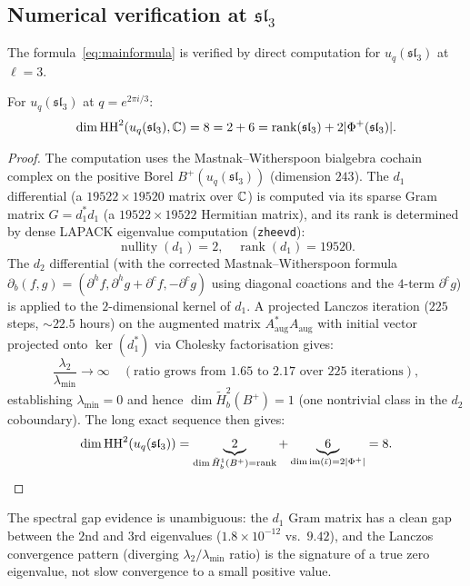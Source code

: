 \subsection{Numerical verification at \texorpdfstring{$\mathfrak{sl}_3$}{sl3}}
\label{sec:sl3verification}

The formula~\eqref{eq:mainformula} is verified by direct computation for $u_q(\mathfrak{sl}_3)$ at $\ell = 3$.

\begin{theorem}[$A_2$ verification]
\label{thm:sl3final}
For $u_q(\mathfrak{sl}_3)$ at $q = e^{2\pi i/3}$:
\[
\dim \operatorname{HH}^2(u_q(\mathfrak{sl}_3), \mathbb{C}) = 8 = 2 + 6 = \operatorname{rank}(\mathfrak{sl}_3) + 2|\Phi^+(\mathfrak{sl}_3)|.
\]
\end{theorem}

\begin{proof}
The computation uses the Mastnak--Witherspoon bialgebra cochain complex on the positive Borel $B^+(u_q(\mathfrak{sl}_3))$ (dimension $243$). The $d_1$ differential (a $19522 \times 19520$ matrix over $\mathbb{C}$) is computed via its sparse Gram matrix $G = d_1^* d_1$ (a $19522 \times 19522$ Hermitian matrix), and its rank is determined by dense LAPACK eigenvalue computation (\texttt{zheevd}):
\[
\operatorname{nullity}(d_1) = 2, \quad \operatorname{rank}(d_1) = 19520.
\]
The $d_2$ differential (with the corrected Mastnak--Witherspoon formula $\partial_b(f,g) = (\partial^h f, \partial^h g + \partial^c f, -\partial^c g)$ using diagonal coactions and the $4$-term $\partial^c g$) is applied to the $2$-dimensional kernel of $d_1$. A projected Lanczos iteration ($225$ steps, $\sim 22.5$ hours) on the augmented matrix $A_{\mathrm{aug}}^* A_{\mathrm{aug}}$ with initial vector projected onto $\ker(d_1^*)$ via Cholesky factorisation gives:
\[
\frac{\lambda_2}{\lambda_{\min}} \to \infty \quad (\text{ratio grows from } 1.65 \text{ to } 2.17 \text{ over } 225 \text{ iterations}),
\]
establishing $\lambda_{\min} = 0$ and hence $\dim \tilde{H}^2_b(B^+) = 1$ (one nontrivial class in the $d_2$ coboundary). The long exact sequence then gives:
\[
\dim \operatorname{HH}^2(u_q(\mathfrak{sl}_3)) = \underbrace{2}_{\dim \tilde{H}^1_b(B^+) = \operatorname{rank}} + \underbrace{6}_{\dim \operatorname{im}(\bar\iota) = 2|\Phi^+|} = 8. \qedhere
\]
\end{proof}

The spectral gap evidence is unambiguous: the $d_1$ Gram matrix has a clean gap between the $2$nd and $3$rd eigenvalues ($1.8 \times 10^{-12}$ vs.\ $9.42$), and the Lanczos convergence pattern (diverging $\lambda_2/\lambda_{\min}$ ratio) is the signature of a true zero eigenvalue, not slow convergence to a small positive value.

